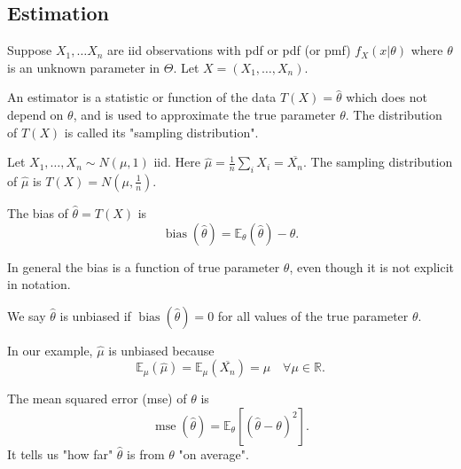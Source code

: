 \documentclass[a4paper]{scrartcl}
\begin{document}
\subsection{Estimation}
Suppose $X_1 , \ldots X_n$ are iid observations with pdf or pdf (or pmf) $f_{X}(x| \theta)$ where $\theta$ is an unknown parameter in $\Theta$. Let $X=(X_1 , \ldots , X_{n})$. 
\begin{definition}[Estimator]
     An estimator is a statistic or function of the data $T (X)=\hat{\theta}$ which does not depend on $\theta$, and is used to approximate the true parameter $\theta$. The distribution of $T (X)$ is called its "sampling distribution". 
\end{definition}
\begin{example}
     Let $X_1 , \ldots ,X_{n} \sim N (\mu,1)$ iid. Here $\hat{\mu}=\frac{1}{n}\sum_{i}^{}X_{i}=\overline{X_{n}}$. The sampling distribution of $\hat{\mu} $ is $T (X)=N (\mu, \frac{1}{n})$.   
\end{example}
\begin{definition}[Bias]
     The bias of $\hat{\theta}=T (X)$ is \[
     \operatorname{bias}(\hat{\theta})=\mathbb{E}_{\theta} (\hat{\theta})-\theta
     .\]  
\end{definition}
\begin{remark}
     In general the bias is a function of true parameter $\theta$, even though it is not explicit in notation.  
\end{remark}
\begin{definition}
     We say $\hat{\theta}$ is unbiased if $\operatorname{bias}(\hat{\theta})=0$ for all values of the true parameter $\theta$. 
\end{definition}
In our example, $\hat{\mu}$ is unbiased because \[
\mathbb{E}_{\mu}(\hat{\mu})=\mathbb{E}_{\mu}(\overline{X_{n}})=\mu \quad \forall \mu \in \mathbb{R}
.\]  
\begin{definition}
     The mean squared error (mse) of $\theta$ is \[
     \operatorname{mse}(\hat{\theta})=\mathbb{E}_{\theta} \left[ (\hat{\theta}-\theta)^2\right]
     .\] 
     It tells us "how far" $\hat{\theta}$ is from $\theta$ "on average".
\end{definition}
\end{document}
